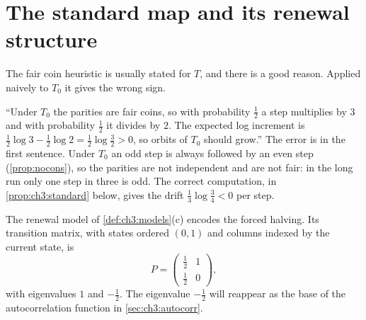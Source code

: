 \section{The standard map and its renewal structure}\label{sec:ch3:standard}

The fair coin heuristic is usually stated for $T$, and there is a good reason.
Applied naively to $T_0$ it gives the wrong sign.

\begin{remark}\label{rem:ch3:naive}
``Under $T_0$ the parities are fair coins, so with probability $\tfrac12$ a step
multiplies by $3$ and with probability $\tfrac12$ it divides by $2$. The
expected log increment is $\tfrac12\log3-\tfrac12\log2=\tfrac12\log\tfrac32>0$,
so orbits of $T_0$ should grow.'' The error is in the first sentence. Under
$T_0$ an odd step is always followed by an even step (\cref{prop:nocons}), so
the parities are not independent and are not fair: in the long run only one
step in three is odd. The correct computation, in
\cref{prop:ch3:standard} below, gives the drift $\tfrac13\log\tfrac34<0$ per
step.
\end{remark}

The renewal model of \cref{def:ch3:models}(c) encodes the forced halving. Its
transition matrix, with states ordered $(0,1)$ and columns indexed by the
current state, is
\[
  P=\begin{pmatrix}\tfrac12&1\\[2pt]\tfrac12&0\end{pmatrix},
\]
with eigenvalues $1$ and $-\tfrac12$. The eigenvalue $-\tfrac12$ will reappear
as the base of the autocorrelation function in \cref{sec:ch3:autocorr}.

